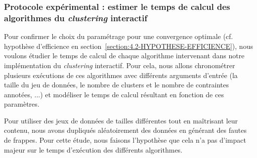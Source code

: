 		\subsubsection{Protocole expérimental : estimer le temps de calcul des algorithmes du \textit{clustering} interactif}
		
			Pour confirmer le choix du paramétrage pour une convergence optimale (cf. hypothèse d'efficience en section~\ref{section:4.2-HYPOTHESE-EFFICIENCE}), nous voulons étudier le temps de calcul de chaque algorithme intervenant dans notre implémentation du \textit{clustering} interactif.
			Pour cela, nous allons chronométrer plusieurs exécutions de ces algorithmes avec différents arguments d'entrée (la taille du jeu de données, le nombre de clusters et le nombre de contraintes annotées, ...) et modéliser le temps de calcul résultant en fonction de ces paramètres.
			
			\begin{leftBarWarning}
				Pour utiliser des jeux de données de tailles différentes tout en maîtrisant leur contenu, nous avons dupliqués aléatoirement des données en générant des fautes de frappes. Pour cette étude, nous faisons l'hypothèse que cela n'a pas d'impact majeur sur le temps d'exécution des différents algorithmes.
			\end{leftBarWarning}
			
